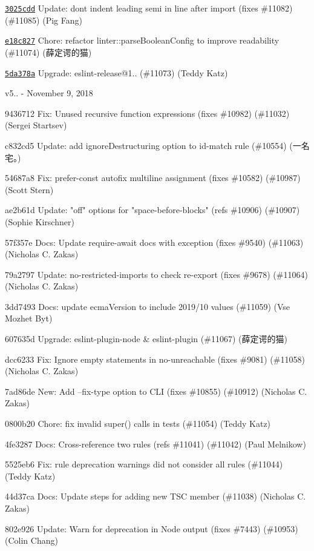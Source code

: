 \begin{DoxyItemize}
\item \href{https://github.com/eslint/eslint/commit/3025cddf0a2ea8461ce05575098a5714fcf6278d}{\texttt{ {\ttfamily 3025cdd}}} Update\+: don\textquotesingle{}t indent leading semi in line after import (fixes \#11082) (\#11085) (Pig Fang)
\item \href{https://github.com/eslint/eslint/commit/e18c827cc12cb1c52e5d0aa993f572cb56238704}{\texttt{ {\ttfamily e18c827}}} Chore\+: refactor linter\+::parse\+Boolean\+Config to improve readability (\#11074) (薛定谔的猫)
\item \href{https://github.com/eslint/eslint/commit/5da378ac922d732ca1765f08edee0face1b1b924}{\texttt{ {\ttfamily 5da378a}}} Upgrade\+: eslint-\/release@1.. (\#11073) (Teddy Katz)
\end{DoxyItemize}

v5.. -\/ November 9, 2018


\begin{DoxyItemize}
\item 9436712 Fix\+: Unused recursive function expressions (fixes \#10982) (\#11032) (Sergei Startsev)
\item c832cd5 Update\+: add {\ttfamily ignore\+Destructuring} option to {\ttfamily id-\/match} rule (\#10554) (一名宅。)
\item 54687a8 Fix\+: prefer-\/const autofix multiline assignment (fixes \#10582) (\#10987) (Scott Stern)
\item ae2b61d Update\+: "{}off"{} options for "{}space-\/before-\/blocks"{} (refs \#10906) (\#10907) (Sophie Kirschner)
\item 57f357e Docs\+: Update require-\/await docs with exception (fixes \#9540) (\#11063) (Nicholas C. Zakas)
\item 79a2797 Update\+: no-\/restricted-\/imports to check re-\/export (fixes \#9678) (\#11064) (Nicholas C. Zakas)
\item 3dd7493 Docs\+: update ecma\+Version to include 2019/10 values (\#11059) (Vse Mozhet Byt)
\item 607635d Upgrade\+: eslint-\/plugin-\/node \& eslint-\/plugin (\#11067) (薛定谔的猫)
\item dcc6233 Fix\+: Ignore empty statements in no-\/unreachable (fixes \#9081) (\#11058) (Nicholas C. Zakas)
\item 7ad86de New\+: Add --fix-\/type option to CLI (fixes \#10855) (\#10912) (Nicholas C. Zakas)
\item 0800b20 Chore\+: fix invalid super() calls in tests (\#11054) (Teddy Katz)
\item 4fe3287 Docs\+: Cross-\/reference two rules (refs \#11041) (\#11042) (Paul Melnikow)
\item 5525eb6 Fix\+: rule deprecation warnings did not consider all rules (\#11044) (Teddy Katz)
\item 44d37ca Docs\+: Update steps for adding new TSC member (\#11038) (Nicholas C. Zakas)
\item 802e926 Update\+: Warn for deprecation in Node output (fixes \#7443) (\#10953) (Colin Chang)
\end{DoxyItemize}

